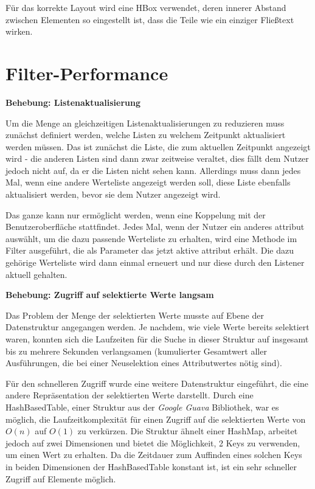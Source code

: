 Für das korrekte Layout wird eine HBox verwendet, deren innerer Abstand zwischen Elementen so eingestellt ist, dass die Teile wie ein einziger Fließtext wirken.

\section{Filter-Performance} \label{sec:verbFilterPerformance}
\textbf{Behebung: Listenaktualisierung}

Um die Menge an gleichzeitigen Listenaktualisierungen zu reduzieren muss zunächst definiert werden, welche Listen zu welchem Zeitpunkt aktualisiert werden müssen. Das ist zunächst die Liste, die zum aktuellen Zeitpunkt angezeigt wird - die anderen Listen sind dann zwar zeitweise veraltet, dies fällt dem Nutzer jedoch nicht auf, da er die Listen nicht sehen kann. Allerdings muss dann jedes Mal, wenn eine andere Werteliste angezeigt werden soll, diese Liste ebenfalls aktualisiert werden, bevor sie dem Nutzer angezeigt wird.

Das ganze kann nur ermöglicht werden, wenn eine Koppelung mit der Benutzeroberfläche stattfindet. Jedes Mal, wenn der Nutzer ein anderes \gls{attribut} auswählt, um die dazu passende Werteliste zu erhalten, wird eine Methode im Filter ausgeführt, die als Parameter das jetzt aktive \gls{attribut} erhält. Die dazu gehörige Werteliste wird dann einmal erneuert und nur diese durch den Listener aktuell gehalten.

\textbf{Behebung: Zugriff auf selektierte Werte langsam}

Das Problem der Menge der selektierten Werte musste auf Ebene der Datenstruktur angegangen werden. Je nachdem, wie viele Werte bereits selektiert waren, konnten sich die Laufzeiten für die Suche in dieser Struktur auf insgesamt bis zu mehrere Sekunden verlangsamen (kumulierter Gesamtwert aller Ausführungen, die bei einer Neuselektion eines Attributwertes nötig sind).

Für den schnelleren Zugriff wurde eine weitere Datenstruktur eingeführt, die eine andere Repräsentation der selektierten Werte darstellt. Durch eine HashBasedTable, einer Struktur aus der \textit{Google Guava} Bibliothek, war es möglich, die Laufzeitkomplexität für einen Zugriff auf die selektierten Werte von $O(n)$ auf $O(1)$ zu verkürzen. Die Struktur ähnelt einer HashMap, arbeitet jedoch auf zwei Dimensionen und bietet die Möglichkeit, 2 Keys zu verwenden, um einen Wert zu erhalten. Da die Zeitdauer zum Auffinden eines solchen Keys in beiden Dimensionen der HashBasedTable konstant ist, ist ein sehr schneller Zugriff auf Elemente möglich.

